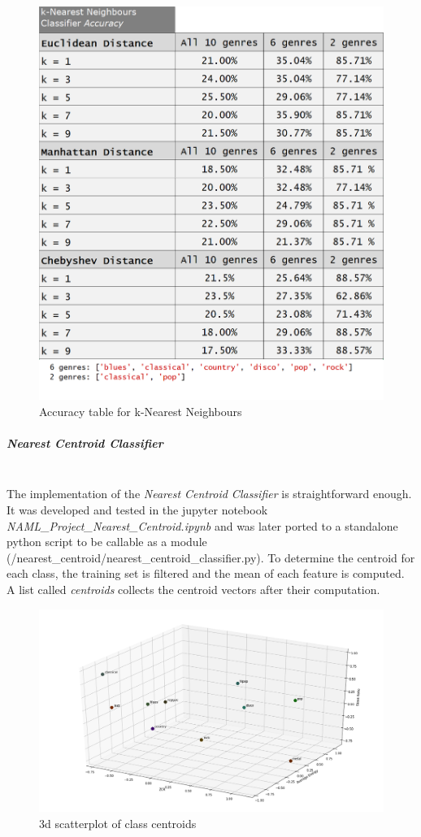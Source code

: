 \documentclass[12pt]{article}
\begin{document}
	\begin{figure}[H]
		\hspace{70pt}\includegraphics[scale=0.5]{knn_acc}
		\caption{Accuracy table for k-Nearest Neighbours}
	\end{figure}
	\newpage
	\subparagraph{Nearest Centroid Classifier}\mbox{}\\\newline
	The implementation of the \textit{Nearest Centroid Classifier} is straightforward enough. It was developed and tested in the jupyter notebook \textit{NAML\_Project\_Nearest\_Centroid.ipynb} and was later ported to a standalone python script to be callable as a module (/nearest\_centroid/nearest\_centroid\_classifier.py). 
	To determine the centroid for each class, the training set is filtered and the mean of each feature is computed. A list called \textit{centroids} collects the centroid vectors after their computation.
	
	\begin{figure}[H]
		\hspace{50pt}\includegraphics[scale=0.4]{centroids_plot}
		\caption{3d scatterplot of class centroids}
	\end{figure}
\end{document}
